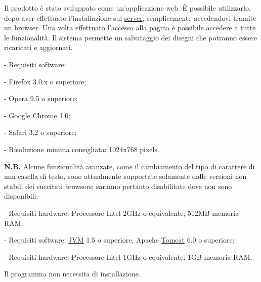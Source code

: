 Il prodotto \`e stato sviluppato come un'applicazione web. \`E possibile utilizzarlo, dopo aver effettuato l'installazione sul \underline{server}, semplicemente accedendovi tramite un browser. Una volta effettuato l'accesso alla pagina \`e possibile accedere a tutte le funzionalit\`a. Il sistema permette un salvataggio dei disegni che potranno essere ricaricati e aggiornati.
 
\begin{elencopuntato}[\normindent]
    \item[-] Requisiti software: 
\begin{elencopuntato}[\normindent]
 \item[-]   Firefox 3.0.x o superiore;
 \item[-]   Opera 9.5 o superiore; 
 \item[-]   Google Chrome 1.0; 
 \item[-]   Safari 3.2 o superiore; 
  \item[-]    Risoluzione minima consigliata: 1024x768 pixels.
\end{elencopuntato}
\textbf{N.B.} Alcune funzionalit\`a avanzate, come il cambiamento del tipo di carattere di una casella di testo, sono attualmente supportate solamente dalle versioni non stabili dei succitati browsers; saranno pertanto disabilitate dove non sono disponibili.
    \item[-] Requisiti hardware: Processore Intel 2GHz o equivalente; 512MB memoria RAM.

\end{elencopuntato}
\begin{elencopuntato}[\normindent]
    \item[-] Requisiti software: \underline{JVM} 1.5 o superiore, Apache \underline{Tomcat} 6.0 o superiore;
    \item[-] Requisiti hardware: Processore Intel 1GHz o equivalente; 1GB memoria RAM.
\end{elencopuntato}
 
 
Il programma non necessita di installazione.
 

